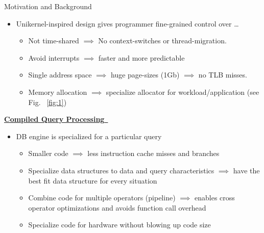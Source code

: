 \begin{block}{Motivation and Background}
\begin{itemize}
    \item {Unikernel-inspired design gives programmer fine-grained control over \ldots}
      \begin{itemize}
      \item Not time-shared $\implies$ No context-switches or thread-migration.
      \item Avoid interrupts $\implies$ faster and more predictable
      \item Single address space $\implies$ huge page-sizes (1Gb) $\implies$ no TLB misses.
      \item Memory allocation $\implies$ specialize allocator for workload/application (see Fig.~ \ref{fig:1})
      \end{itemize}
    \end{itemize}
  
    \underline{\textbf{Compiled Query Processing}~\cite{SK16,N11}}
    \begin{itemize}
    \item DB engine is specialized for a particular query
      \begin{itemize}
      \item Smaller code $\implies$ less instruction cache misses and branches
      \item Specialize data structures to data and query characteristics $\implies$ have the best fit data structure for every situation
      \item Combine code for multiple operators (pipeline) $\implies$ enables cross operator optimizations and avoids function call overhead
      \item Specialize code for hardware without blowing up code size
      \end{itemize}
    \end{itemize}
\end{block}


